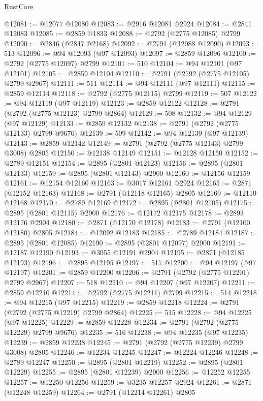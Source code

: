 \begin{lexlean}{RustCore}
\begin{coremodule}
@12081 := @12077 @12080
@12083 := @2916 @12081 @2924
@12084 := @2841 @12083
@12085 := @2859 @1833
@12088 := @2792 (@2775 @12085) @2799
@12090 := @2846 (@2847 @2168)
@12092 := @2791 (@12088 @12090)
@12093 := 513
@12096 := @94 @12093 (@97 @12093)
@12097 := @2859 @12096
@12100 := @2792 (@2775 @12097) @2799
@12101 := 510
@12104 := @94 @12101 (@97 @12101)
@12105 := @2859 @12104
@12110 := @2791 (@2792 (@2775 @12105) @2799 @2967)
@12111 := 511
@12114 := @94 @12111 (@97 @12111)
@12115 := @2859 @12114
@12118 := @2792 (@2775 @12115) @2799
@12119 := 507
@12122 := @94 @12119 (@97 @12119)
@12123 := @2859 @12122
@12128 := @2791 (@2792 (@2775 @12123) @2799 @2864)
@12129 := 508
@12132 := @94 @12129 (@97 @12129)
@12133 := @2859 @12132
@12138 := @2791 (@2792 (@2775 @12133) @2799 @9676)
@12139 := 509
@12142 := @94 @12139 (@97 @12139)
@12143 := @2859 @12142
@12149 := @2791 (@2792 (@2775 @12143) @2799 @3008) @2805
@12150 := @12138 @12149
@12151 := @12128 @12150
@12152 := @2789 @12151
@12154 := @2895 (@2801 @12123)
@12156 := @2895 (@2801 @12133)
@12159 := @2895 (@2801 @12143) @2900
@12160 := @12156 @12159
@12161 := @12154 @12160
@12163 := @3017 @12161 @2924
@12165 := @2871 (@12152 @12163)
@12168 := @2791 (@12118 @12165) @2805
@12169 := @12110 @12168
@12170 := @2789 @12169
@12172 := @2895 (@2801 @12105)
@12175 := @2895 (@2801 @12115) @2900
@12176 := @12172 @12175
@12178 := @2893 @12176 @2904
@12180 := @2871 (@12170 @12178)
@12183 := @2791 (@12100 @12180) @2805
@12184 := @12092 @12183
@12185 := @2789 @12184
@12187 := @2895 (@2801 @12085)
@12190 := @2895 (@2801 @12097) @2900
@12191 := @12187 @12190
@12193 := @3055 @12191 @2904
@12195 := @2871 (@12185 @12193)
@12196 := @2895 @12195
@12197 := 517
@12200 := @94 @12197 (@97 @12197)
@12201 := @2859 @12200
@12206 := @2791 (@2792 (@2775 @12201) @2799 @2967)
@12207 := 518
@12210 := @94 @12207 (@97 @12207)
@12211 := @2859 @12210
@12214 := @2792 (@2775 @12211) @2799
@12215 := 514
@12218 := @94 @12215 (@97 @12215)
@12219 := @2859 @12218
@12224 := @2791 (@2792 (@2775 @12219) @2799 @2864)
@12225 := 515
@12228 := @94 @12225 (@97 @12225)
@12229 := @2859 @12228
@12234 := @2791 (@2792 (@2775 @12229) @2799 @9676)
@12235 := 516
@12238 := @94 @12235 (@97 @12235)
@12239 := @2859 @12238
@12245 := @2791 (@2792 (@2775 @12239) @2799 @3008) @2805
@12246 := @12234 @12245
@12247 := @12224 @12246
@12248 := @2789 @12247
@12250 := @2895 (@2801 @12219)
@12252 := @2895 (@2801 @12229)
@12255 := @2895 (@2801 @12239) @2900
@12256 := @12252 @12255
@12257 := @12250 @12256
@12259 := @3235 @12257 @2924
@12261 := @2871 (@12248 @12259)
@12264 := @2791 (@12214 @12261) @2805

\end{coremodule}
\end{lexlean}
